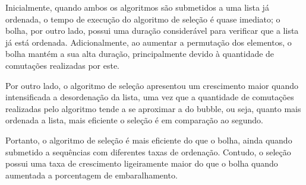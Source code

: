 Inicialmente, quando ambos os algoritmos são submetidos a uma lista já ordenada, o tempo de execução do algoritmo de seleção é quase imediato; o bolha, por outro lado, possui uma duração considerável para verificar que a lista já está ordenada. Adicionalmente, ao aumentar a permutação dos elementos, o bolha mantém a sua alta duração, principalmente devido à quantidade de comutações realizadas por este.

Por outro lado, o algoritmo de seleção apresentou um crescimento maior quando intensificada a desordenação da lista, uma vez que a quantidade de comutações realizadas pelo algoritmo tende a se aproximar a do bubble, ou seja, quanto mais ordenada a lista, mais eficiente o seleção é em comparação ao segundo.

Portanto, o algoritmo de seleção é mais eficiente do que o bolha, ainda quando submetido a sequências com diferentes taxas de ordenação. Contudo, o seleção possui uma taxa de crescimento ligeiramente maior do que o bolha quando aumentada a porcentagem de embaralhamento.
